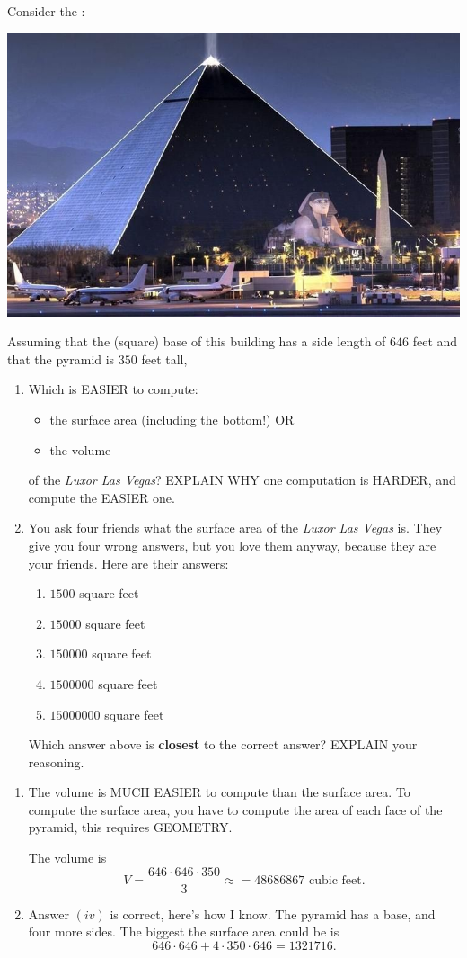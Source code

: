 \documentclass[nooutcomes,noauthor,hints]{ximera}
\begin{document}
\begin{question}
  Consider the :
  \begin{center}
    \includegraphics[width=.4\textwidth]{pyramid.jpg} 
  \end{center}
 Assuming that the (square) base of this building has a side length of
 $646$ feet and that the pyramid is $350$ feet tall,
  \begin{enumerate}
  \item Which is EASIER to compute:
    \begin{itemize}
    \item the surface area (including the bottom!) OR
    \item the volume
    \end{itemize}
    of the \textit{Luxor Las Vegas}? EXPLAIN WHY one computation is
    HARDER, and compute the EASIER one.
  \item %

    You ask four friends what the surface area of the
    \textit{Luxor Las Vegas} is. They give you four wrong answers, but
    you love them anyway, because they are your friends. Here are
    their answers:
    \begin{enumerate}
    \item $1500$ square feet
    \item $15000$ square feet
    \item $150000$ square feet
    \item $1500000$ square feet
    \item $15000000$ square feet
    \end{enumerate}
    Which answer above is \textbf{closest} to the correct answer? EXPLAIN your reasoning.
  \end{enumerate}
  \begin{freeResponse}
    \begin{enumerate}
      \item The volume is MUCH EASIER to compute than the surface
        area. To compute the surface area, you have to compute the
        area of each face of the pyramid, this requires GEOMETRY.

        The volume is
        \[
        V = \frac{646\cdot 646\cdot 350}{3} \approx = 48686867 \text{ cubic feet}.
        \]
      \item Answer $(iv)$ is correct, here's how I know. The pyramid
        has a base, and four more sides. The biggest the surface area could be is
        \[
        646\cdot 646+ 4\cdot 350\cdot 646 = 1321716.
        \]
    \end{enumerate}
  \end{freeResponse}
\end{question}
\end{document}
